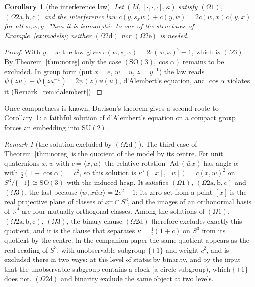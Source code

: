 \documentclass[11pt,reqno]{amsart}
\newtheorem{corollary}[theorem]{Corollary}
\theoremstyle{definition}
\theoremstyle{remark}
\newtheorem{remark}[theorem]{Remark}
\numberwithin{equation}{section}
\newcommand{\R}{\mathbb{R}}
\newcommand{\Ad}{\operatorname{Ad}}
\newcommand{\ip}[2]{\langle #1,#2\rangle}
\newcommand{\hp}[3]{[#1,#2,#3]}
\newcommand{\SU}{\mathrm{SU}}
\newcommand{\SO}{\mathrm{SO}}
\begin{document}
\begin{corollary}[the interference law]\label{cor:interference}
Let $(M,\hp\cdot\cdot\cdot,\kappa)$ satisfy $(\Omega1)$, $(\Omega2\mathrm{a,b,c})$ and the interference law
$c(y,s_xw)+c(y,w)=2c(w,x)c(y,x)$ for all $w,x,y$.  Then it is isomorphic to one of the structures of
Example~\ref{ex:models}; neither $(\Omega2\mathrm d)$ nor $(\Omega2\mathrm e)$ is needed.
\end{corollary}
\begin{proof}
With $y=w$ the law gives $c(w,s_xw)=2c(w,x)^2-1$, which is $(\Omega3)$.  By Theorem~\ref{thm:noreg} only the case
$(\SO(3),\cos\alpha)$ remains to be excluded.  In group form (put $x=e$, $w=u$, $z=y^{-1}$) the law reads
$\psi(zu)+\psi(zu^{-1})=2\psi(z)\psi(u)$, d'Alembert's equation, and $\cos\alpha$ violates it (Remark~\ref{rem:dalembert}).
\end{proof}

Once compactness is known, Davison's theorem \cite{Davison08} gives a second route to Corollary~\ref{cor:interference}:
a faithful solution of d'Alembert's equation on a compact group forces an embedding into $\SU(2)$.

\begin{remark}[the solution excluded by $(\Omega2\mathrm d)$]\label{rem:quotient}
The third case of Theorem~\ref{thm:noreg} is the quotient of the model by its centre.  For unit quaternions $x,w$ with
$c=\ip xw$, the relative rotation $\Ad(\bar wx)$ has angle $\alpha$ with $\tfrac12(1+\cos\alpha)=c^2$, so this solution is
$\kappa'([x],[w])=c(x,w)^2$ on $S^3/\{\pm1\}\cong\SO(3)$ with the induced heap.  It satisfies $(\Omega1)$, $(\Omega2\mathrm{a,b,c})$ and
$(\Omega3)$, the last because $\ip w{x\bar wx}=2c^2-1$; its zero set from a point $[x]$ is the real projective plane of classes
of $x^\perp\cap S^3$, and the images of an orthonormal basis of $\R^4$ are four mutually orthogonal classes.  Among the solutions
of $(\Omega1)$, $(\Omega2\mathrm{a,b,c})$, $(\Omega3)$, the binary clause $(\Omega2\mathrm d)$ therefore excludes exactly this quotient, and it
is the clause that separates $\kappa=\tfrac12(1+c)$ on $S^3$ from its quotient by the centre.  In the companion paper
\cite{Companion} the same quotient appears as the real reading of $S^3$, with unobservable subgroup $\{\pm1\}$ and weight
$c^2$, and is excluded there in two ways: at the level of states by binarity, and by the input that the unobservable subgroup contains a
clock (a circle subgroup), which $\{\pm1\}$ does not.  $(\Omega2\mathrm d)$ and binarity exclude the same object at two levels.
\end{remark}
\end{document}
